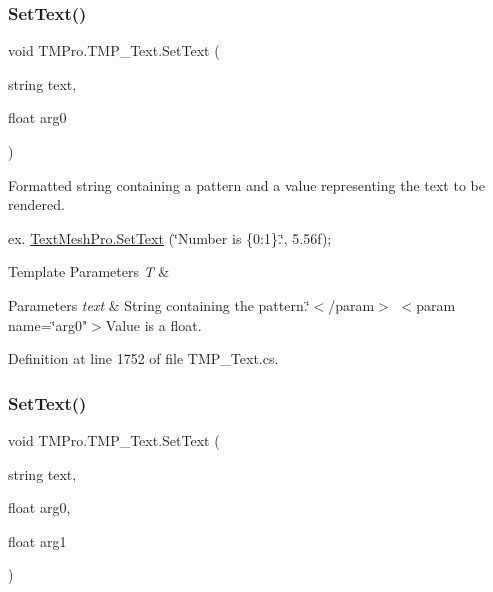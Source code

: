 \subsubsection{\texorpdfstring{SetText()}{SetText()}\hspace{0.1cm}{\footnotesize\ttfamily [3/6]}}
{\footnotesize\ttfamily void T\+M\+Pro.\+T\+M\+P\+\_\+\+Text.\+Set\+Text (\begin{DoxyParamCaption}\item[{string}]{text,  }\item[{float}]{arg0 }\end{DoxyParamCaption})}





Formatted string containing a pattern and a value representing the text to be rendered.

ex. \mbox{\hyperlink{class_t_m_pro_1_1_t_m_p___text_a8aebc83540d494fd574a92470762fdaa}{Text\+Mesh\+Pro.\+Set\+Text}} (\char`\"{}\+Number is \{0\+:1\}.\char`\"{}, 5.\+56f);


\begin{DoxyTemplParams}{Template Parameters}
{\em T} & \\
\hline
\end{DoxyTemplParams}

\begin{DoxyParams}{Parameters}
{\em text} & String containing the pattern.\char`\"{}$<$/param$>$
$<$param name=\char`\"{}arg0"$>$Value is a float.\\
\hline
\end{DoxyParams}


Definition at line 1752 of file T\+M\+P\+\_\+\+Text.\+cs.

\mbox{\label{class_t_m_pro_1_1_t_m_p___text_a0a802e1851eafb258d66e0f15f32728f}} 
\subsubsection{\texorpdfstring{SetText()}{SetText()}\hspace{0.1cm}{\footnotesize\ttfamily [4/6]}}
{\footnotesize\ttfamily void T\+M\+Pro.\+T\+M\+P\+\_\+\+Text.\+Set\+Text (\begin{DoxyParamCaption}\item[{string}]{text,  }\item[{float}]{arg0,  }\item[{float}]{arg1 }\end{DoxyParamCaption})}





